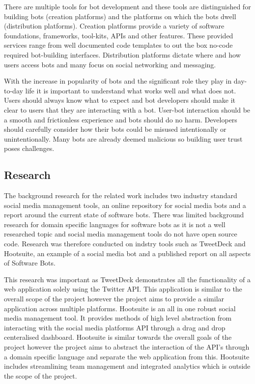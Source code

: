 \documentclass[chapterprefix=false]{scrreprt}
\begin{document}
There are multiple tools for bot development and these tools are distinguished for building bots (creation platforms) and the platforms on which the bots dwell (distribution platforms). Creation platforms provide a variety of software foundations, frameworks, tool-kits, APIs and other features. These provided services range from well documented code templates to out the box no-code required bot-building interfaces. Distribution platforms dictate where and how users access bots and many focus on social networking and messaging. 

With the increase in popularity of bots and the significant role they play in day-to-day life it is important to understand what works well and what does not. Users should always know what to expect and bot developers should make it clear to users that they are interacting with a bot. User-bot interaction should be a smooth and frictionless experience and bots should do no harm. Developers should carefully consider how their bots could be misused intentionally or unintentionally. Many bots are already deemed malicious so building user trust poses challenges\cite{8239928}.

\subsection{Research}

The background research for the related work includes two industry standard social media management tools, an online repository for social media bots and a report around the current state of software bots. There was limited background research for domain specific languages for software bots as it is not a well researched topic and social media management tools do not have open source code. Research was therefore conducted on indstry tools such as TweetDeck and Hootsuite, an example of a social media bot and a published report on all aspects of Software Bots. 

This research was important as TweetDeck demonstrates all the functionality of a web application solely using the Twitter API. This application is similar to the overall scope of the project however the project aims to provide a similar application across multiple platforms. Hootsuite is an all in one robust social media management tool. It provides methods of high level abstraction from interacting with the social media platforms API through a drag and drop centeralised dashboard. Hootsuite is similar towards the overall goals of the project however the project aims to abstract the interaction of the API's through a domain specific language and separate the web application from this. Hootsuite includes streamlining team management and integrated analytics which is outside the scope of the project.
\end{document}
